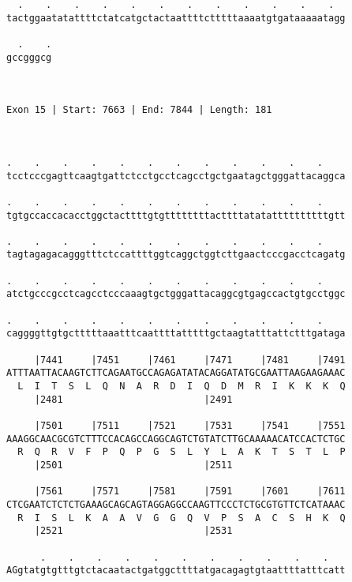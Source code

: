 \documentclass{article}
\begin{document}
\begin{Verbatim}
  .    .    .    .    .    .    .    .    .    .    .    .  
tactggaatatattttctatcatgctactaattttctttttaaaatgtgataaaaatagg
                                                            
  .    .
gccgggcg
        
        
 
Exon 15 | Start: 7663 | End: 7844 | Length: 181



.    .    .    .    .    .    .    .    .    .    .    .    
tcctcccgagttcaagtgattctcctgcctcagcctgctgaatagctgggattacaggca
                                                            
.    .    .    .    .    .    .    .    .    .    .    .    
tgtgccaccacacctggctacttttgtgttttttttacttttatatattttttttttgtt
                                                            
.    .    .    .    .    .    .    .    .    .    .    .    
tagtagagacagggtttctccattttggtcaggctggtcttgaactcccgacctcagatg
                                                            
.    .    .    .    .    .    .    .    .    .    .    .    
atctgcccgcctcagcctcccaaagtgctgggattacaggcgtgagccactgtgcctggc
                                                            
.    .    .    .    .    .    .    .    .    .    .    .    
caggggttgtgctttttaaatttcaattttatttttgctaagtatttattctttgataga
                                                            
     |7441     |7451     |7461     |7471     |7481     |7491
ATTTAATTACAAGTCTTCAGAATGCCAGAGATATACAGGATATGCGAATTAAGAAGAAAC
  L  I  T  S  L  Q  N  A  R  D  I  Q  D  M  R  I  K  K  K  Q
     |2481                         |2491                    
  
     |7501     |7511     |7521     |7531     |7541     |7551
AAAGGCAACGCGTCTTTCCACAGCCAGGCAGTCTGTATCTTGCAAAAACATCCACTCTGC
  R  Q  R  V  F  P  Q  P  G  S  L  Y  L  A  K  T  S  T  L  P
     |2501                         |2511                    
  
     |7561     |7571     |7581     |7591     |7601     |7611
CTCGAATCTCTCTGAAAGCAGCAGTAGGAGGCCAAGTTCCCTCTGCGTGTTCTCATAAAC
  R  I  S  L  K  A  A  V  G  G  Q  V  P  S  A  C  S  H  K  Q
     |2521                         |2531                    
  
      .    .    .    .    .    .    .    .    .    .    .   
AGgtatgtgtttgtctacaatactgatggcttttatgacagagtgtaattttatttcatt
                                                            

\end{Verbatim}
\end{document}
